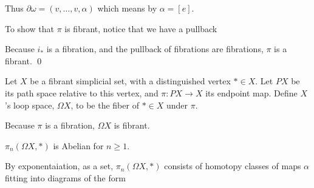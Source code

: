     \bigskip
    \centerline{}

    Thus $\partial\omega=(v,\dots,v,\alpha)$ which means by  $\alpha=[e]$.

    To show that $\pi$ is fibrant, notice that we have a pullback

    \centerline{}
    \medskip

    Because $i_*$ is a fibration, and the pullback of fibrations are fibrations, $\pi$ is a fibrant.
    \qed

\eproof

\bdefn

    Let $X$ be a fibrant simplicial set, with a distinguished vertex $*\in X$.
    Let $PX$ be its path space relative to this vertex, and $\pi\colon PX\to X$ its endpoint map.
    Define $X$'s {\emphcolor loop space}, $\Omega X$, to be the fiber of $*\in X$ under $\pi$.

\edefn

Because $\pi$ is a fibration, $\Omega X$ is fibrant.

\blemm

    $\pi_n(\Omega X,*)$ is Abelian for $n\geq1$.

\elemm

\bproof

    By exponentaiation, as a set, $\pi_n(\Omega X,*)$ consists of homotopy classes of maps $\alpha$ fitting into diagrams of the form

    \medskip
    \centerline{}

